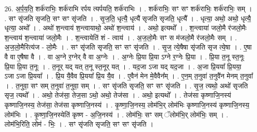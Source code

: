 \documentclass[17pt]{extarticle}
\begin{document}
26. अ॒र्प॒य॒ति॒ शर्क॑राभिः॒ शर्क॑राभि रर्पय त्यर्पयति॒ शर्क॑राभिः । . शर्क॑राभिः॒ सꣳ सꣳ शर्क॑राभिः॒ शर्क॑राभिः॒ सम् । . सꣳ सृ॑जति सृजति॒ सꣳ सꣳ सृ॑जति । . सृ॒ज॒ति॒ धृत्यै॒ धृत्यै॑ सृजति सृजति॒ धृत्यै᳚ । . धृत्या॒ अथो॒ अथो॒ धृत्यै॒ धृत्या॒ अथो᳚ । . अथो॑ श॒न्त्वाय॑ श॒न्त्वायाथो॒ अथो॑ श॒न्त्वाय॑ । . अथो॒ इत्यथो᳚ । . श॒न्त्वाया॑ जलो॒मै र॑जलो॒मैः श॒न्त्वाय॑ श॒न्त्वाया॑ जलो॒मैः । . श॒न्त्वायेति॑ शं - त्वाय॑ । . अ॒ज॒लो॒मैः सꣳ स म॑जलो॒मै र॑जलो॒मैः सम् । . अ॒ज॒लो॒मैरित्य॑ज - लो॒मैः । . सꣳ सृ॑जति सृजति॒ सꣳ सꣳ सृ॑जति । . सृ॒ज॒ त्ये॒षैषा सृ॑जति सृज त्ये॒षा । . ए॒षा वै वा ए॒षैषा वै । . वा अ॒ग्ने र॒ग्नेर् वै वा अ॒ग्नेः । . अ॒ग्नेः प्रि॒या प्रि॒या ऽग्ने र॒ग्नेः प्रि॒या । . प्रि॒या त॒नू स्त॒नूः प्रि॒या प्रि॒या त॒नूः । . त॒नूर् यद् यत् त॒नू स्त॒नूर् यत् । . यद॒जा ऽजा यद् यद॒जा । . अ॒जा प्रि॒यया᳚ प्रि॒यया॒ ऽजा ऽजा प्रि॒यया᳚ । . प्रि॒य यै॒वैव प्रि॒यया᳚ प्रि॒य यै॒व । . ए॒वैन॑ मेन मे॒वैवैन᳚म् । . ए॒न॒म् त॒नुवा॑ त॒नुवै॑न मेनम् त॒नुवा᳚ । . त॒नुवा॒ सꣳ सम् त॒नुवा॑ त॒नुवा॒ सम् । . सꣳ सृ॑जति सृजति॒ सꣳ सꣳ सृ॑जति । . सृ॒ज॒ त्यथो॒ अथो॑ सृजति सृज॒ त्यथो᳚ । . अथो॒ तेज॑सा॒ तेज॒सा ऽथो॒ अथो॒ तेज॑सा । . अथो॒ इत्यथो᳚ । . तेज॑सा कृष्णाजि॒नस्य॑ कृष्णाजि॒नस्य॒ तेज॑सा॒ तेज॑सा कृष्णाजि॒नस्य॑ । . कृ॒ष्णा॒जि॒नस्य॒ लोम॑भि॒र् लोम॑भिः कृष्णाजि॒नस्य॑ कृष्णाजि॒नस्य॒ लोम॑भिः । . कृ॒ष्णा॒जि॒नस्येति॑ कृष्ण - अ॒जि॒नस्य॑ । . लोम॑भिः॒ सꣳ सम् ॅलोम॑भि॒र् लोम॑भिः॒ सम् । . लोम॑भि॒रिति॒ लोम॑ - भिः॒ । . सꣳ सृ॑जति सृजति॒ सꣳ सꣳ सृ॑जति । \newline
\end{document}
